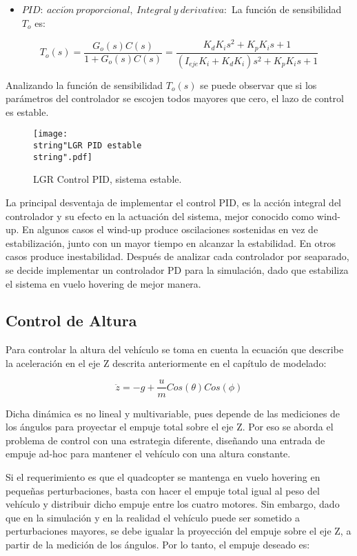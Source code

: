 \documentclass[../main.tex]{subfiles}
\begin{document}
\begin{itemize}
\item $PID:\ acci\acute{o}n\ proporcional,\ Integral\ y\ derivativa:$ La
función de sensibilidad $T_{o}$ es:
\end{itemize}
\[
T_{o}(s)=\frac{G_{o}(s)C(s)}{1+G_{o}(s)C(s)}=\frac{K_{d}K_{i}s^{2}+K_{p}K_{i}s+1}{(I_{eje}K_{i}+K_{d}K_{i})s^{2}+K_{p}K_{i}s+1}
\]


Analizando la función de sensibilidad $T_{o}(s)$ se puede observar
que si los parámetros del controlador se escojen todos mayores que
cero, el lazo de control es estable. 

\begin{figure}[H]
\noindent \begin{centering}
\texttt{[image: \\string"LGR PID estable\\string".pdf]}
\par\end{centering}
\caption{LGR Control PID, sistema estable.}
\end{figure}

La principal desventaja de implementar el control PID, es la acción integral del controlador y su efecto en la actuación del sistema, mejor conocido como wind-up. 
En algunos casos el wind-up produce oscilaciones sostenidas en vez de estabilización, junto con un mayor tiempo en alcanzar la estabilidad. En otros casos produce inestabilidad. 
Después de analizar cada controlador por seaparado, se decide implementar
un controlador PD para la simulación, dado que estabiliza el sistema
en vuelo hovering de mejor manera. 

\subsection{Control de Altura}

Para controlar la altura del vehículo se toma en cuenta la ecuación
que describe la aceleración en el eje Z descrita anteriormente en
el capítulo de modelado:

\[
\ddot{z}=-g+\frac{u}{m}Cos(\theta)Cos(\phi)
\]

Dicha dinámica es no lineal y multivariable, pues depende de las mediciones
de los ángulos para proyectar el empuje total sobre el eje Z. Por
eso se aborda el problema de control con una estrategia diferente,
diseñando una entrada de empuje ad-hoc para mantener el vehículo con
una altura constante.

Si el requerimiento es que el quadcopter se mantenga en vuelo hovering
en pequeñas perturbaciones, basta con hacer el empuje total igual
al peso del vehículo y distribuir dicho empuje entre los cuatro motores.
Sin embargo, dado que en la simulación y en la realidad el vehículo
puede ser sometido a perturbaciones mayores, se debe igualar la proyección
del empuje sobre el eje Z, a partir de la medición de los ángulos.
Por lo tanto, el empuje deseado es:
\end{document}
